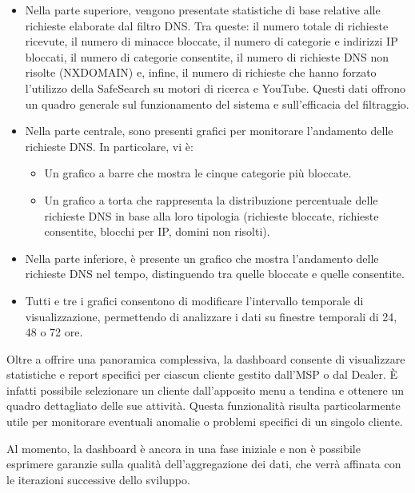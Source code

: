 \begin{itemize}
  \item Nella parte superiore, vengono presentate statistiche di base relative alle richieste elaborate dal filtro DNS. Tra queste: il numero totale di richieste ricevute, il numero di minacce bloccate, il numero di categorie e indirizzi IP bloccati, il numero di categorie consentite, il numero di richieste DNS non risolte (NXDOMAIN) e, infine, il numero di richieste che hanno forzato l’utilizzo della SafeSearch su motori di ricerca e YouTube. Questi dati offrono un quadro generale sul funzionamento del sistema e sull'efficacia del filtraggio.

  \item Nella parte centrale, sono presenti grafici per monitorare l’andamento delle richieste DNS. In particolare, vi è:
    \begin{itemize}
      \item Un grafico a barre che mostra le cinque categorie più bloccate.
      \item Un grafico a torta che rappresenta la distribuzione percentuale delle richieste DNS in base alla loro tipologia (richieste bloccate, richieste consentite, blocchi per IP, domini non risolti).
    \end{itemize}

  \item Nella parte inferiore, è presente un grafico che mostra l’andamento delle richieste DNS nel tempo, distinguendo tra quelle bloccate e quelle consentite.

  \item Tutti e tre i grafici consentono di modificare l'intervallo temporale di visualizzazione, permettendo di analizzare i dati su finestre temporali di 24, 48 o 72 ore.
\end{itemize}
%
Oltre a offrire una panoramica complessiva, la dashboard consente di visualizzare statistiche e report specifici per ciascun cliente gestito dall’MSP o dal Dealer. È infatti possibile selezionare un cliente dall'apposito menu a tendina e ottenere un quadro dettagliato delle sue attività. Questa funzionalità risulta particolarmente utile per monitorare eventuali anomalie o problemi specifici di un singolo cliente.

Al momento, la dashboard è ancora in una fase iniziale e non è possibile esprimere garanzie sulla qualità dell'aggregazione dei dati, che verrà affinata con le iterazioni successive dello sviluppo.


